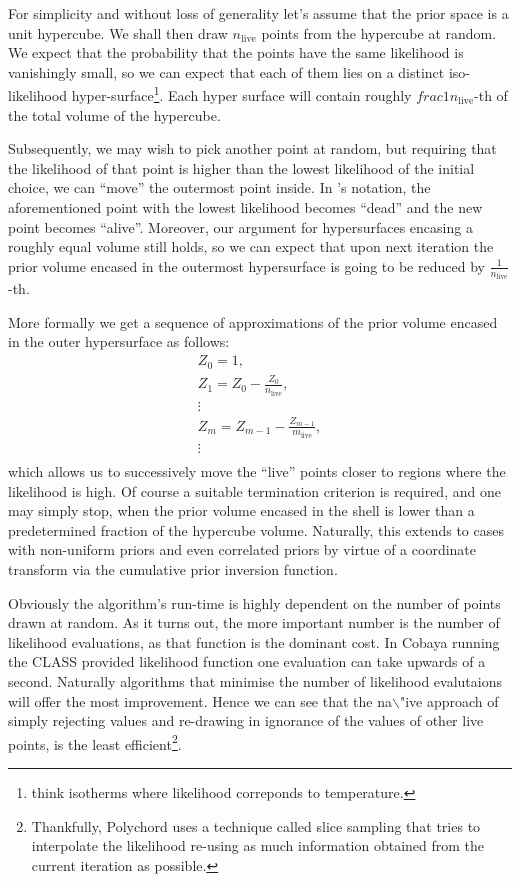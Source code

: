 \documentclass[usenatbib]{mnras}
\begin{document}
For simplicity and without loss of generality let's assume that the
prior space is a unit hypercube.  We shall then draw
\(n_\text{live}\) points from the hypercube at random. We expect
that the probability that the points have the same likelihood is
vanishingly small, so we can expect that each of them lies on a
distinct iso-likelihood hyper-surface\footnote{think isotherms  where likelihood correponds to temperature.}. Each hyper surface
will contain roughly \(frac{1}{n_\text{live}}\)-th of the total
volume of the hypercube.

Subsequently, we may wish to pick another point at random, but
requiring that the likelihood of that point is higher than the
lowest likelihood of the initial choice, we can ``move'' the
outermost point inside. In \citeauthor{skilling2006} 's notation, the
aforementioned point with the lowest likelihood becomes ``dead''
and the new point becomes ``alive''. Moreover, our argument for
hypersurfaces encasing a roughly equal volume still holds, so we
can expect that upon next iteration the prior volume encased in the
outermost hypersurface is going to be reduced by \(\frac{1}{n_\text{live}}\)-th. 

More formally we get a sequence of approximations of the prior
volume encased in the outer hypersurface as follows:
\begin{eqnarray}
  Z_{0} = 1,\\
  Z_{1} = Z_{0} - \frac{Z_{0}}{n_\text{live}},\\
  \vdots\\
  Z_{m} = Z_{m-1} - \frac{Z_{m-1}}{m_\text{live}},\\
  \vdots\\
\end{eqnarray}
which allows us to successively move the ``live'' points closer to
regions where the likelihood is high. Of course a suitable
termination criterion is required, and one may simply stop, when
the prior volume encased in the shell is lower than a predetermined
fraction of the hypercube volume. Naturally, this extends to cases
with non-uniform priors and even correlated priors by virtue of a
coordinate transform via the cumulative prior inversion function.

Obviously the algorithm's run-time is highly dependent on the
number of points drawn at random. As it turns out, the more
important number is the number of likelihood evaluations, as that
function is the dominant cost. In Cobaya running the CLASS provided
likelihood function one evaluation can take upwards of a
second. Naturally algorithms that minimise the number of likelihood
evalutaions will offer the most improvement. Hence we can see that
the na$\backslash$"ive approach of simply rejecting values and re-drawing in
ignorance of the values of other live points, is the least
efficient\footnote{Thankfully, Polychord uses a technique called slice   sampling that tries to interpolate the likelihood re-using as much  information obtained from the current iteration as possible.}.
\end{document}
